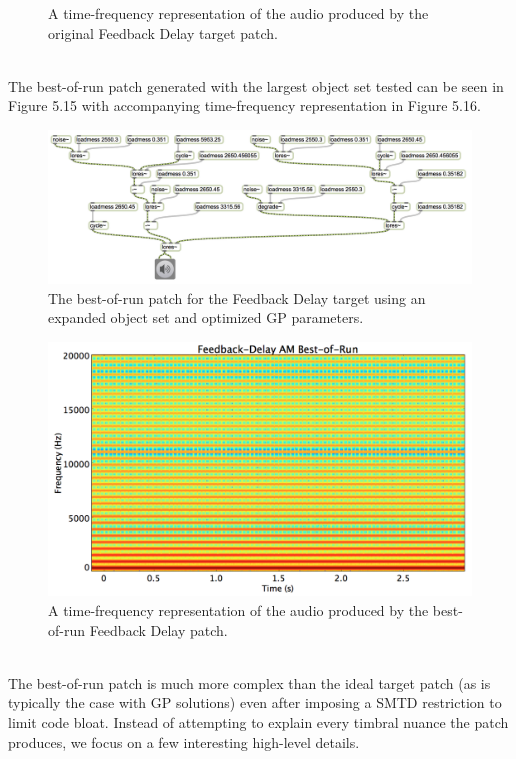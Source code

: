 \documentclass[12pt]{report} 	%
\numberwithin{figure}{chapter}
\numberwithin{table}{chapter}
\numberwithin{equation}{chapter}
\begin{document}
\begin{flushleft}
\begin{figure}[h!]
\begin{center}
\caption[Original feedback delay time-frequency representation]{A time-frequency representation of the audio produced by the original Feedback Delay target patch.}
\end{center}
\end{figure}
\\
The best-of-run patch generated with the largest object set tested can be seen in Figure 5.15 with accompanying time-frequency representation in Figure 5.16.
\begin{figure}[h!]
\begin{center}
\includegraphics[angle=270, scale=0.60]{DelayFeedbackAM_Best}
\caption[Feedback delay best-of-run patch]{The best-of-run patch for the Feedback Delay target using an expanded object set and optimized GP parameters.}
\end{center}
\end{figure}
\begin{figure}[h!]
\begin{center}
\includegraphics[scale=0.35,width=\linewidth]{FeedbackDelayAMBestOfRunSTFT}
\caption[Best-of-run feedback delay time-frequency representation]{A time-frequency representation of the audio produced by the best-of-run Feedback Delay patch.}
\end{center}
\end{figure}
\\
The best-of-run patch is much more complex than the ideal target patch (as is typically the case with GP solutions) even after imposing a SMTD restriction to limit code bloat. Instead of attempting to explain every timbral nuance the patch produces, we focus on a few interesting high-level details.


\end{flushleft}
\end{document}
